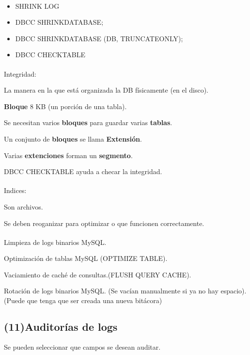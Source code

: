\documentclass{article}
\begin{document}
\paragraph{}
\begin{itemize}
	\item
	SHRINK LOG
	\item
	DBCC SHRINKDATABASE;
	\item
	DBCC SHRINKDATABASE (DB, TRUNCATEONLY);
	\item
	DBCC CHECKTABLE
\end{itemize}


\paragraph{}
Integridad:

La manera en la que está organizada la DB físicamente (en el disco).

\textbf{Bloque} 8 KB (un porción de una tabla).

Se necesitan varios \textbf{bloques} para guardar varias \textbf{tablas}.

Un conjunto de \textbf{bloques} se llama \textbf{Extensión}.

Varias \textbf{extenciones} forman un \textbf{segmento}.

DBCC CHECKTABLE ayuda a checar la integridad.

\paragraph{}
Indices:

Son archivos.

Se deben reoganizar para optimizar o que funcionen correctamente.

\paragraph{}
Limpieza de logs binarios MySQL.

Optimización de tablas MySQL (OPTIMIZE TABLE).

Vaciamiento de caché de consultas.(FLUSH QUERY CACHE).

Rotación de logs binarios MySQL. (Se vacían manualmente si ya no hay espacio).
(Puede que tenga que ser creada una nueva bitácora)

\subsection{(11)Auditorías de logs}
Se pueden seleccionar que campos se desean auditar.
\end{document}
